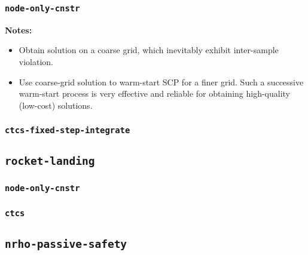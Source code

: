 \documentclass[11pt,a4paper]{article}
\begin{document}
\subsubsection{\texttt{node-only-cnstr}}

\textbf{Notes:}
\begin{itemize}
    \item Obtain solution on a coarse grid, which inevitably exhibit inter-sample violation.
    \item Use coarse-grid solution to warm-start SCP for a finer grid. Such a successive warm-start process is very effective and reliable for obtaining high-quality (low-cost) solutions.
\end{itemize}

\subsubsection{\texttt{ctcs-fixed-step-integrate}}

\subsection{\texttt{rocket-landing}}

\subsubsection{\texttt{node-only-cnstr}}

\subsubsection{\texttt{ctcs}}

\subsection{\texttt{nrho-passive-safety}}
\end{document}
